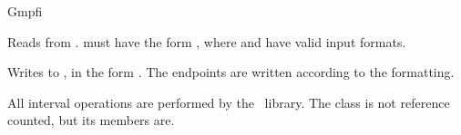 \begin{ccRefClass} {Gmpfi}



        {Reads  from .  must have the form
        , where  and  have valid
         input formats.}

        {Writes  to , in the form .
        The endpoints are written according to the  formatting.}


\ccImplementation
All interval operations are performed by the \mpfi~library. The class
 is not reference counted, but its members are.

\ccSeeAlso
{}\\
\\
\\
\\
\\

\end{ccRefClass}
